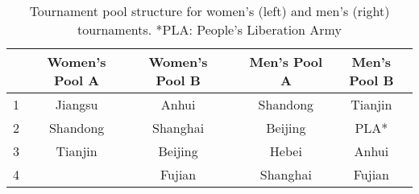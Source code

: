 \begin{table}[]
  \centering
\begin{tabular}{@{}lcclcc@{}}
\toprule
  & \textbf{Women's Pool A} & \textbf{Women's Pool B} &  & \textbf{Men's Pool A} & \textbf{Men's Pool B} \\ \midrule
1 & Jiangsu                 & Anhui                   &  & Shandong              & Tianjin               \\
2 & Shandong                & Shanghai                &  & Beijing               & PLA*                  \\
3 & Tianjin                 & Beijing                 &  & Hebei                 & Anhui                 \\
4 &                         & Fujian                  &  & Shanghai              & Fujian                \\ \bottomrule
\end{tabular}

\caption{Tournament pool structure for women's (left) and men's (right) tournaments. *PLA: People's Liberation Army}
\label{tab:poolStructureTable}
\end{table}
